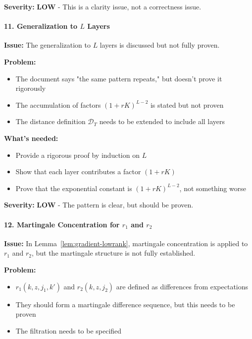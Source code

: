 \textbf{Severity:} \textbf{LOW} - This is a clarity issue, not a correctness issue.

\paragraph*{11. Generalization to $L$ Layers}

\textbf{Issue:} The generalization to $L$ layers is discussed but not fully proven.

\textbf{Problem:}
\begin{itemize}
\item The document says "the same pattern repeats," but doesn't prove it rigorously
\item The accumulation of factors $(1+rK)^{L-2}$ is stated but not proven
\item The distance definition $\mathscr{D}_T$ needs to be extended to include all layers
\end{itemize}

\textbf{What's needed:}
\begin{itemize}
\item Provide a rigorous proof by induction on $L$
\item Show that each layer contributes a factor $(1+rK)$
\item Prove that the exponential constant is $(1+rK)^{L-2}$, not something worse
\end{itemize}

\textbf{Severity:} \textbf{LOW} - The pattern is clear, but should be proven.

\paragraph*{12. Martingale Concentration for $r_1$ and $r_2$}

\textbf{Issue:} In Lemma~\ref{lem:gradient-lowrank}, martingale concentration is applied to $r_1$ and $r_2$, but the martingale structure is not fully established.

\textbf{Problem:}
\begin{itemize}
\item $r_1(k, z, j_1, k')$ and $r_2(k, z, j_2)$ are defined as differences from expectations
\item They should form a martingale difference sequence, but this needs to be proven
\item The filtration needs to be specified
\end{itemize}

